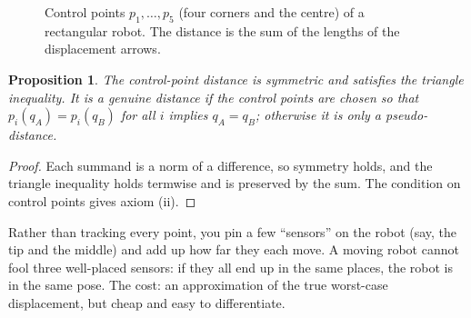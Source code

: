 \documentclass[11pt,a4paper]{article}
\newcommand{\norm}[1]{\lVert #1\rVert}
\theoremstyle{definition}
\theoremstyle{plain}
\newtheorem{proposition}[definition]{Proposition}
\theoremstyle{remark}
\begin{document}
\begin{figure}[ht]
\centering
{}
\caption{Control points $p_1,\dots,p_5$ (four corners and the centre) of a rectangular robot. The distance is the sum of the lengths of the displacement arrows.}
\end{figure}

\begin{proposition}
The control-point distance is symmetric and satisfies the triangle inequality. It is a genuine distance if the control points are chosen so that $p_i(q_A)=p_i(q_B)$ for all $i$ implies $q_A=q_B$; otherwise it is only a pseudo-distance.
\end{proposition}

\begin{proof}
Each summand is a norm of a difference, so symmetry holds, and the triangle inequality holds termwise and is preserved by the sum. The condition on control points gives axiom (ii). 
\end{proof}

\begin{intuition}
Rather than tracking every point, you pin a few ``sensors'' on the robot (say, the tip and the middle) and add up how far they each move. A moving robot cannot fool three well-placed sensors: if they all end up in the same places, the robot is in the same pose. The cost: an approximation of the true worst-case displacement, but cheap and easy to differentiate.
\end{intuition}
\end{document}
